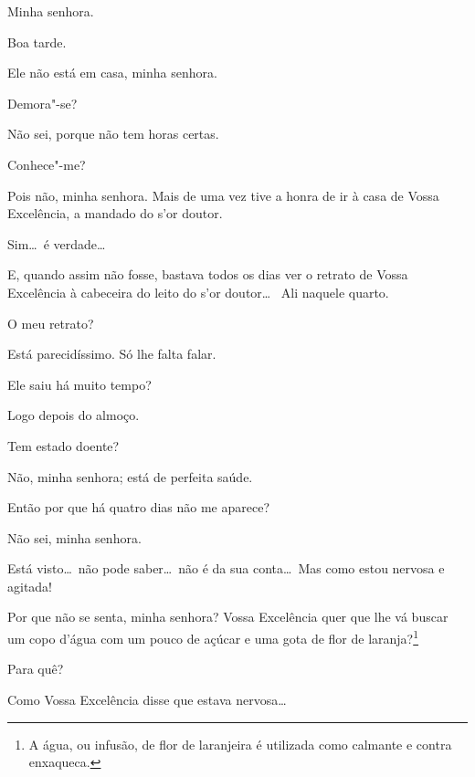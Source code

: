 
  Minha
senhora.

  Boa tarde. 

  Ele não está em casa, minha senhora.

  Demora"-se?

  Não sei, porque não tem horas certas.

  Conhece"-me?

  Pois não, minha senhora. Mais de uma vez tive a honra de
ir à casa de Vossa Excelência, a mandado do s'or
doutor.

  Sim\ldots\ é verdade\ldots

  E, quando assim não fosse, bastava todos os dias ver o
retrato de Vossa Excelência à cabeceira do leito do
s'or doutor\ldots\  Ali naquele quarto.

  O meu retrato?

  Está parecidíssimo. Só lhe falta falar.

  Ele saiu há muito tempo?

  Logo depois do almoço.

  Tem estado doente?

  Não, minha senhora; está de perfeita saúde.

   Então por que há quatro
dias não me aparece?

  Não sei, minha senhora.

  Está visto\ldots\ não pode saber\ldots\ não é da sua conta\ldots\ Mas como
estou nervosa e agitada!

  Por que
não se senta, minha senhora?  Vossa
Excelência quer que lhe vá buscar um copo d'água com
um pouco de açúcar e uma gota de flor de laranja?\footnote{
A água, ou infusão, de flor de laranjeira é utilizada como calmante e contra enxaqueca.}

  Para quê?

  Como Vossa Excelência disse que estava nervosa\ldots

